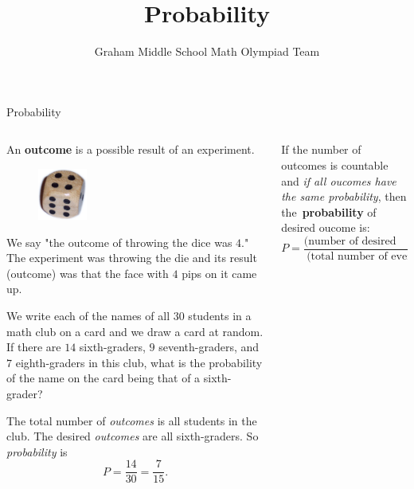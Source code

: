 \documentclass[9pt,aspectratio=169]{beamer}
\title{Probability}
\subtitle[Graham Middle School]{Graham Middle School Math Olympiad Team}
\begin{document}
\maketitle

\begin{frame}{Probability}
  \begin{columns}[T]
    \begin{column}{0.5\textwidth}
      \begin{definition}
        An \textbf{outcome} is a possible result of an experiment.
      \end{definition}

      \begin{figure}%
        \vspace{-1em}
        \includegraphics[width=0.25\textwidth]{03 - Probability/dice-4.png}
      \end{figure}
      We say "the outcome of throwing the dice was $4$." The experiment was throwing the die and its result (outcome) was that the face with $4$ pips on it came up.\medskip
  
      \begin{problem}
        We write each of the names of all $30$ students in a math club on a card and we draw a card at random. If there are $14$ sixth-graders, $9$ seventh-graders, and $7$ eighth-graders in this club, what is the probability of the name on the card being that of a sixth-grader? 
      \end{problem}
      The total number of \emph{outcomes} is all students in the club. The desired \emph{outcomes} are all sixth-graders. So \emph{probability} is
      \[
        P = \frac{14}{30} = \frac{7}{15}.
      \]
    \end{column}
    \begin{column}{0.5\textwidth}
      \begin{definition}
        If the number of outcomes is countable and \emph{if all oucomes have the same probability}, then \mbox{the~\textbf{probability}} of desired oucome is:
        \[ P = \frac{\text{(number of desired outcomes)}}{\text{(total number of events)}}. \]
        \vspace*{-1.5ex}
      \end{definition}


\end{column}
\end{columns}
\end{frame}
\end{document}
